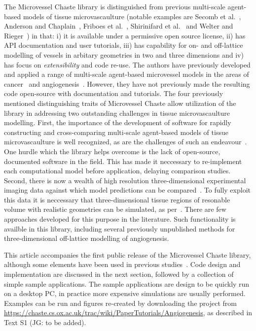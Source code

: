 \documentclass[10pt,letterpaper]{article}
\begin{document}
The Microvessel Chaste library is distinguished from previous multi-scale agent-based models of tissue microvascaulture (notable examples are Secomb et al.~\cite{Secomb2013}, Anderson and Chaplain~\cite{Anderson1998}, Friboes et al.~\cite{Frieboes2007}, Shirinifard et al.~\cite{Shirinifard2009} and Welter and Rieger~\cite{Welter2013}) in that: i) it is available under a permissive open source license, ii) has API documentation and user tutorials, iii) has capability for on- and off-lattice modelling of vessels in arbitary geometries in two and three dimensions and iv) has focus on \emph{extensibility} and code re-use. The authors have previously developed and applied a range of multi-scale agent-based microvessel models in the areas of cancer~\cite{Alarcon2005, Perfahl2011} and angiogenesis~\cite{Connor2015}. However, they have not previously made the resulting code open-source with documentation and tutorials. The four previously mentioned distinguishing traits of Microvessel Chaste allow utilization of the library in addressing two outstanding challenges in tissue microvascaulture modelling. First, the importance of the development of software for rapidly constructing and cross-comparing multi-scale agent-based models of tissue microvascaulture is well recognized, as are the challenges of such an endeavour~\cite{Rieger2015, Connor2012}. One hurdle which the library helps overcome is the lack of open-source, documented software in the field. This has made it neccessary to re-implement each computational model before application, delaying comparison studies. Second, there is now a wealth of high resolution three-dimensional experimental imaging data against which model predictions can be compared~\cite{Tozer2004}. To fully exploit this data it is neccessary that three-dimensional tissue regions of resonable volume with realistic geometries can be simulated, as per~\cite{Grogan2016}. There are few approaches developed for this purpose in the literature. Such functionality is availble in this library, including several previously unpublished methods for three-dimensional off-lattice modelling of angiogenesis.  

This article accompanies the first public release of the Microvessel Chaste library, although some elements have been used in previous studies~\cite{Connor2015, Grogan2016}. Code design and implementation are discussed in the next section, followed by a collection of simple sample applications. The sample applications are design to be quickly run on a desktop PC, in practice more expensive simulations are usually performed. Examples can be run and figures re-created by downloading the project from \url{https://chaste.cs.ox.ac.uk/trac/wiki/PaperTutorials/Angiogenesis}, as described in Text S1 (JG: to be added). 
\end{document}
